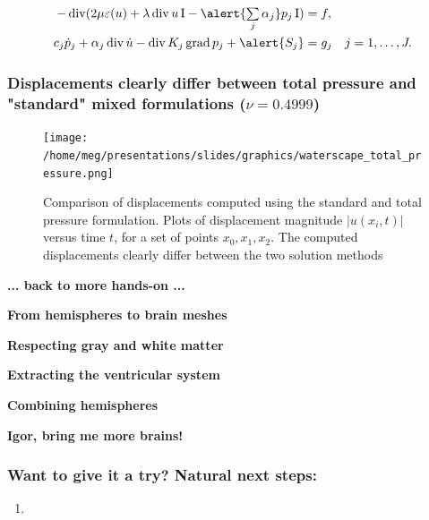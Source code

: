 \documentclass[10pt, mathserif, aspectratio=169, t]{beamer}
\DeclareMathOperator{\Div}{\mathrm{div}}
\DeclareMathOperator{\Grad}{\mathrm{grad}}
\newcommand{\mysection}[1]{\begin{frame} \begin{center} \vspace{3em} \textbf{#1} \end{center} \end{frame}}
\newcommand{\videosection}[3]{\begin{frame} \begin{center} \vspace{3em} \href{#2}{\textcolor{rognesred}{\textbf{#1}}} \end{center} #3 \end{frame}}
\DeclareMathOperator{\ssum}{\textstyle \sum}
\begin{document}
\begin{frame}
  \begin{align*}
    - \Div (2 \mu \varepsilon(u) + \lambda \Div u \, \mathrm{I} - \alert{\ssum_{j} \alpha_j} p_j \, \mathrm{I} ) &= f, \\
    c_{j} \dot{p}_{j} + \alpha_{j} \Div \dot{u} - \Div K_{j} \Grad p_{j} + \alert{S_j} &= g_{j} \quad j = 1, \dots, J.
  \end{align*}
\end{frame}

\begin{frame}
\end{frame}




\begin{frame}
  \frametitle{Displacements clearly differ between total pressure and "standard" mixed formulations ($\nu = 0.4999$)}
  \centering
  \begin{figure}
  \texttt{[image: /home/meg/presentations/slides/graphics/waterscape\_total\_pressure.png]}
  \caption{Comparison of displacements computed using the standard and
    total pressure formulation. Plots of displacement magnitude
    $|u(x_i, t)|$ versus time $t$, for a set of points $x_0, x_1,
    x_2$. The computed displacements clearly differ between the two
    solution methods}
  \end{figure}
\end{frame}

\mysection{... back to more hands-on ...}

\mysection{From hemispheres to brain meshes}

\mysection{Respecting gray and white matter}


\mysection{Extracting the ventricular system}


\mysection{Combining hemispheres}






\mysection{Igor, bring me more brains!}
 
\begin{frame}
\frametitle{Want to give it a try? Natural next steps:}
\begin{enumerate}
\item
\end{enumerate}
\end{frame}

\end{document}
